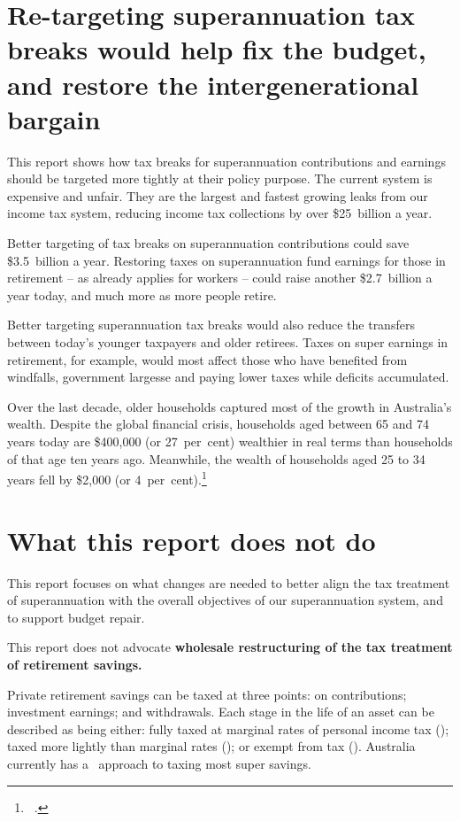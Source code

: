 \section{Re-targeting superannuation tax breaks would help fix the budget, and restore the intergenerational bargain}
This report shows how tax breaks for superannuation contributions and earnings should be targeted more tightly at their policy purpose. The current system is expensive and unfair. They are the largest and fastest growing leaks from our income tax system, reducing income tax collections by over \$25~billion a year. 

Better targeting of tax breaks on superannuation contributions could save \$3.5~billion a year. Restoring taxes on superannuation fund earnings for those in retirement – as already applies for workers – could raise another \$2.7~billion a year today, and much more as more people retire. 

Better targeting superannuation tax breaks would also reduce the transfers between today’s younger taxpayers and older retirees. Taxes on super earnings in retirement, for example, would most affect those who have benefited from windfalls, government largesse and paying lower taxes while deficits accumulated.

Over the last decade, older households captured most of the growth in Australia’s wealth. Despite the global financial crisis, households aged between 65 and 74 years today are \$400,000 (or 27~per~cent) wealthier in real terms than households of that age ten years ago. Meanwhile, the wealth of households aged 25 to 34 years fell by \$2,000 (or 4~per~cent).\footnote{\gao\ \textcites{ABS2015HouseholdIncomeWealth1314}{ABS2006HES0304}.}

\section{What this report does not do}\label{sec:SUPER-what-this-report-does-not-do}
This report focuses on what changes are needed to better align the tax treatment of superannuation with the overall objectives of our superannuation system, and to support budget repair. 

This report does not advocate \textbf{wholesale restructuring of the tax treatment of retirement savings. }

Private retirement savings can be taxed at three points: on contributions; investment earnings; and withdrawals. Each stage in the life of an asset can be described as being either: fully taxed at marginal rates of personal income tax (\taxabbrevT); taxed more lightly than marginal rates (\taxabbrevt); or exempt from tax (\taxabbrevE). Australia currently has a \ttE\ approach to taxing most super savings.

